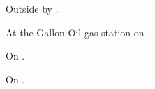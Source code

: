 
\begin{LocationList}

Outside  by .

At the Gallon Oil gas station on .

On .

\Location{\TruckService \Service \Rest}
On .

\end{LocationList}
